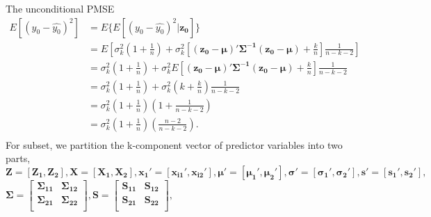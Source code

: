 The unconditional PMSE
$$\begin{aligned}
E[(y_0-\hat{y_0})^2]&=E\{E[(y_0-\hat{y_0})^2|\boldsymbol{z_0}]\}\\
&=E\left[\sigma_k^2\left(1+\frac{1}{n}\right)+\sigma_k^2 \left[\boldsymbol{(z_0-\mu)'\Sigma^{-1}(z_0-\mu)}+\frac{k}{n} \right]\frac{1}{n-k-2}\right]\\
&=\sigma_k^2\left(1+\frac{1}{n}\right)+\sigma_k^2 E\left[\boldsymbol{(z_0-\mu)'\Sigma^{-1}(z_0-\mu)}+\frac{k}{n} \right]\frac{1}{n-k-2}\\
&=\sigma_k^2\left(1+\frac{1}{n}\right)+\sigma_k^2 \left(k+\frac{k}{n} \right)\frac{1}{n-k-2}\\
&=\sigma_k^2\left(1+\frac{1}{n}\right)\left(1+\frac{1}{n-k-2}\right)\\
&=\sigma_k^2\left(1+\frac{1}{n}\right)\left(\frac{n-2}{n-k-2}\right).\\
\end{aligned}
$$
For subset, we partition the k-component vector of predictor variables into two parts, $\boldsymbol{Z=[Z_{1},Z_{2}],X=[X_1,X_2],x_1'=[x_{i1}',x_{i2}'],\mu'=[\mu_1',\mu_2'] ,\sigma'=[\sigma_1',\sigma_2'],s'=[s_1',s_2'],}$ $\boldsymbol{\Sigma}=\begin{bmatrix} 
\boldsymbol{\Sigma_{11}} & \boldsymbol{\Sigma_{12}}\\  
   \boldsymbol{ \Sigma_{21}} & \boldsymbol{\Sigma_{22}} \\  
\end{bmatrix},\boldsymbol{S}=\begin{bmatrix} 
    \boldsymbol{S_{11} }& \boldsymbol{S_{12}} \\  
    \boldsymbol{S_{21}} & \boldsymbol{S_{22}} \\  
\end{bmatrix},$

